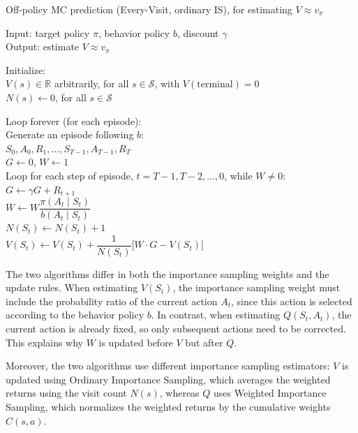 \begin{algobox}{Off-policy MC prediction (Every-Visit, ordinary IS), for estimating $V \approx v_\pi$}
\raggedright
Input: target policy $\pi$, behavior policy $b$, discount $\gamma$\\
Output: estimate $V \approx v_\pi$

\medskip
Initialize:\\
\hspace*{1.5em}$V(s) \in \mathbb{R}$ arbitrarily, for all $s \in \mathcal{S}$, with $V(\text{terminal}) = 0$\\
\hspace*{1.5em}$N(s) \leftarrow 0$, for all $s \in \mathcal{S}$

\medskip
Loop forever (for each episode):\\
\hspace*{1.5em}Generate an episode following $b$:\\
\hspace*{3em}$S_0, A_0, R_1, \dots, S_{T-1}, A_{T-1}, R_T$\\
\hspace*{1.5em}$G \leftarrow 0$, $W \leftarrow 1$\\
\hspace*{1.5em}Loop for each step of episode, $t = T-1, T-2, \dots, 0$, while $W \neq 0$:\\
\hspace*{3em}$G \leftarrow \gamma G + R_{t+1}$\\
\hspace*{3em}$W \leftarrow W \dfrac{\pi(A_t \mid S_t)}{b(A_t \mid S_t)}$\\
\hspace*{3em}$N(S_t) \leftarrow N(S_t) + 1$\\
\hspace*{3em}$V(S_t) \leftarrow V(S_t) +
\dfrac{1}{N(S_t)}\bigl[W \cdot G - V(S_t)\bigr]$
\end{algobox}
The two algorithms differ in both the importance sampling weights and the update rules. When estimating $V(S_t)$, the importance sampling weight must include the probability ratio of the current action $A_t$, since this action is selected according to the behavior policy $b$. In contrast, when estimating $Q(S_t,A_t)$, the current action is already fixed, so only subsequent actions need to be corrected. This explains why $W$ is updated before $V$ but after $Q$.

Moreover, the two algorithms use different importance sampling estimators: $V$ is updated using Ordinary Importance Sampling, which averages the weighted returns using the visit count $N(s)$, whereas $Q$ uses Weighted Importance Sampling, which normalizes the weighted returns by the cumulative weights $C(s,a)$.

